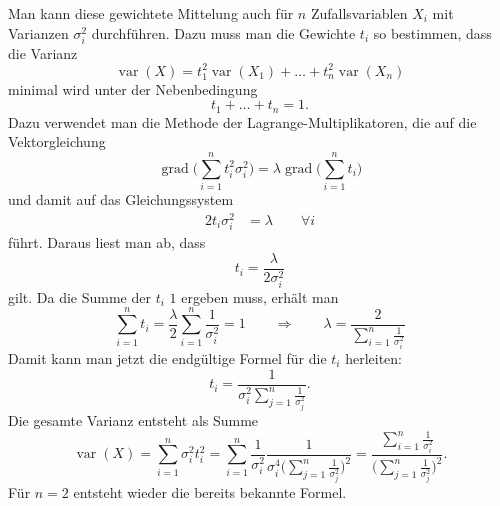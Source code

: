 \begin{diskussion}
Man kann diese gewichtete Mittelung auch für $n$ Zufallsvariablen $X_i$
mit Varianzen $\sigma_i^2$ durchführen.
Dazu muss man die Gewichte $t_i$ so bestimmen, dass die Varianz
\[
\operatorname{var}(X)
=
t_1^2\operatorname{var}(X_1)
+\dots+
t_n^2\operatorname{var}(X_n)
\]
minimal wird unter der Nebenbedingung 
\[
t_1+\dots+t_n=1.
\]
Dazu verwendet man die Methode der Lagrange-Multiplikatoren, die auf
die Vektorgleichung
\[
\operatorname{grad}\biggl(\sum_{i=1}^nt_i^2\sigma_i^2\biggr)
=
\lambda \operatorname{grad}\biggl(\sum_{i=1}^nt_i\biggr)
\]
und damit auf das Gleichungssystem
\begin{align*}
2t_i\sigma_i^2&=\lambda\qquad \forall i
\end{align*}
führt.
Daraus liest man ab, dass 
\[
t_i
=
\frac{\lambda}{2\sigma_i^2}
\]
gilt.
Da die Summe der $t_i$ $1$ ergeben muss, erhält man
\[
\sum_{i=1}^n t_i
=
\frac{\lambda}{2}
\sum_{i=1}^n \frac{1}{\sigma_i^2}
=
1
\qquad\Rightarrow\qquad
\lambda=\frac{2}{\displaystyle\sum_{i=1}^n\frac1{\sigma_i^2}}
\]
Damit kann man jetzt die endgültige Formel für die $t_i$ herleiten:
\[
t_i
=
\frac{1}{\displaystyle\sigma_i^2\sum_{j=1}^n\frac{1}{\sigma_j^2}}.
\]
Die gesamte Varianz entsteht als Summe 
\[
\operatorname{var}(X)
=
\sum_{i=1}^n\sigma_i^2t_i^2
=
\sum_{i=1}^n\frac{1}{\sigma_i^2}
\frac{1}{\displaystyle\sigma_i^4\biggl(\sum_{j=1}^n\frac{1}{\sigma_j^2}\biggr)^2}
=
\frac{\displaystyle\sum_{i=1}^n \frac1{\sigma_i^2}}{
\biggl(\displaystyle\sum_{j=1}^n\frac{1}{\sigma_j^2}\biggr)^2}.
\]
Für $n=2$ entsteht wieder die bereits bekannte Formel.
\end{diskussion}

